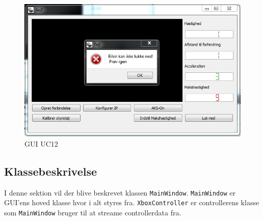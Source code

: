 \begin{figure}[H]
\centering
\includegraphics[width=\textwidth* 3/4,height=\textwidth* 9/20 ]{../fig/billeder/gui_uc12.png}
\caption{GUI UC12}
\label{fig:GUI_uc12}
\end{figure}


\subsection{Klassebeskrivelse}
I denne sektion vil der blive beskrevet klassen \texttt{MainWindow}. \texttt{MainWindow} er GUI'ens hoved klasse hvor i alt styres fra. \texttt{XboxController} er controllerens klasse som \texttt{MainWindow} bruger til at streame controllerdata fra.

